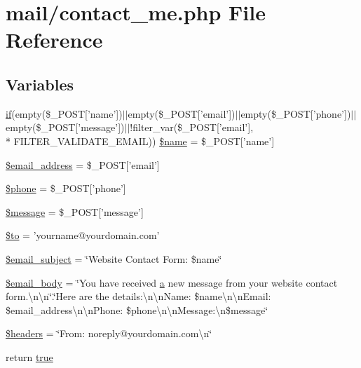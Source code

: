 \hypertarget{contact__me_8php}{\section{mail/contact\+\_\+me.php File Reference}
\label{contact__me_8php}
}
\subsection*{Variables}
\begin{DoxyCompactItemize}
\item 
\hyperlink{classie_8js_a55bf8e12339412d59e0a999214324127}{if}(empty(\$\+\_\+\+P\+O\+S\+T\mbox{[}'name'\mbox{]})$\vert$$\vert$empty(\$\+\_\+\+P\+O\+S\+T\mbox{[}'email'\mbox{]})$\vert$$\vert$empty(\$\+\_\+\+P\+O\+S\+T\mbox{[}'phone'\mbox{]})$\vert$$\vert$empty(\$\+\_\+\+P\+O\+S\+T\mbox{[}'message'\mbox{]})$\vert$$\vert$!filter\+\_\+var(\$\+\_\+\+P\+O\+S\+T\mbox{[}'email'\mbox{]}, \\*
F\+I\+L\+T\+E\+R\+\_\+\+V\+A\+L\+I\+D\+A\+T\+E\+\_\+\+E\+M\+A\+I\+L)) \hyperlink{contact__me_8php_a278961b02c1c2852ff166f23bc231ea4}{\$name} = \$\+\_\+\+P\+O\+S\+T\mbox{[}'name'\mbox{]}
\item 
\hyperlink{contact__me_8php_a773bb6f6146878ed0ff7059eda635549}{\$email\+\_\+address} = \$\+\_\+\+P\+O\+S\+T\mbox{[}'email'\mbox{]}
\item 
\hyperlink{contact__me_8php_afca642079313f7c6c3f8d4368f779882}{\$phone} = \$\+\_\+\+P\+O\+S\+T\mbox{[}'phone'\mbox{]}
\item 
\hyperlink{contact__me_8php_abf17cb2dba2ed17cb28aa5f37deb5293}{\$message} = \$\+\_\+\+P\+O\+S\+T\mbox{[}'message'\mbox{]}
\item 
\hyperlink{contact__me_8php_ac19f839b525d6d99d063fe56bf2a6d3b}{\$to} = 'yourname@yourdomain.\+com'
\item 
\hyperlink{contact__me_8php_a8b423a7af7e669b288eacca16f0aab0b}{\$email\+\_\+subject} = \char`\"{}Website Contact Form\+: \$name\char`\"{}
\item 
\hyperlink{contact__me_8php_ae8d78bb1129ef7c43c7d9aebc4fa3ad8}{\$email\+\_\+body} = \char`\"{}You have received \hyperlink{bootstrap_8min_8js_a1f5870dcf487187f13d5fd328ed9e6e7}{a} new message from your website contact form.\textbackslash{}n\textbackslash{}n\char`\"{}.\char`\"{}Here are the details\+:\textbackslash{}n\textbackslash{}n\+Name\+: \$name\textbackslash{}n\textbackslash{}n\+Email\+: \$email\+\_\+address\textbackslash{}n\textbackslash{}n\+Phone\+: \$phone\textbackslash{}n\textbackslash{}n\+Message\+:\textbackslash{}n\$message\char`\"{}
\item 
\hyperlink{contact__me_8php_a52500036ee807241b8b4b7e2367c49ef}{\$headers} = \char`\"{}From\+: noreply@yourdomain.\+com\textbackslash{}n\char`\"{}
\item 
return \hyperlink{contact__me_8php_a930920b2bc42824a5c03be681830f4b2}{true}
\end{DoxyCompactItemize}


